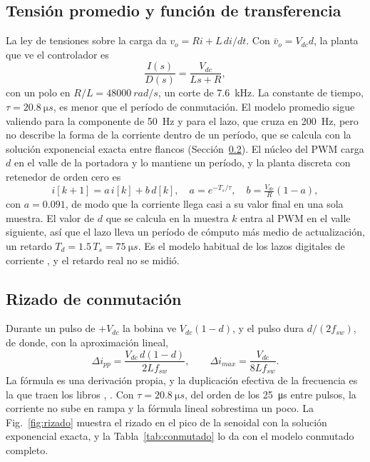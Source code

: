 \documentclass[journal]{IEEEtran}
\begin{document}
\subsection{Tensión promedio y función de transferencia}
\label{sec:ft}
La ley de tensiones sobre la carga da $v_o=Ri+L\,di/dt$. Con $\bar v_o=V_{dc}d$, la planta que ve el controlador es
\begin{equation}
	\frac{I(s)}{D(s)}=\frac{V_{dc}}{Ls+R},
	\label{eq:planta}
\end{equation}
con un polo en $R/L=\SI{48000}{rad/s}$, un corte de \SI{7.6}{kHz}. La constante de tiempo, $\tau=\SI{20.8}{\micro s}$, es menor que el período de conmutación. El modelo promedio sigue valiendo para la componente de \SI{50}{Hz} y para el lazo, que cruza en \SI{200}{Hz}, pero no describe la forma de la corriente dentro de un período, que se calcula con la solución exponencial exacta entre flancos (Sección~\ref{sec:rizado}). El núcleo del PWM carga $d$ en el valle de la portadora y lo mantiene un período, y la planta discreta con retenedor de orden cero es
\begin{equation}
	i[k+1]=a\,i[k]+b\,d[k],\quad a=e^{-T_s/\tau},\quad b=\tfrac{V_{dc}}{R}(1-a),
	\label{eq:discreta}
\end{equation}
con $a=\num{0.091}$, de modo que la corriente llega casi a su valor final en una sola muestra. El valor de $d$ que se calcula en la muestra $k$ entra al PWM en el valle siguiente, así que el lazo lleva un período de cómputo más medio de actualización, un retardo $T_d=1.5\,T_s=\SI{75}{\micro s}$. Es el modelo habitual de los lazos digitales de corriente \cite{buso2006}, y el retardo real no se midió.

\subsection{Rizado de conmutación}
\label{sec:rizado}
Durante un pulso de $+V_{dc}$ la bobina ve $V_{dc}(1-d)$, y el pulso dura $d/(2f_{sw})$, de donde, con la aproximación lineal,
\begin{equation}
	\Delta i_{pp}=\frac{V_{dc}\,d(1-d)}{2Lf_{sw}},\qquad
	\Delta i_{max}=\frac{V_{dc}}{8Lf_{sw}}.
	\label{eq:rizado}
\end{equation}
La fórmula es una derivación propia, y la duplicación efectiva de la frecuencia es la que traen los libros \cite[sec.~8-3-2]{mohan2003power}, \cite[sec.~8.11]{hart2011}. Con $\tau=\SI{20.8}{\micro s}$, del orden de los \SI{25}{\micro s} entre pulsos, la corriente no sube en rampa y la fórmula lineal sobrestima un poco. La Fig.~\ref{fig:rizado} muestra el rizado en el pico de la senoidal con la solución exponencial exacta, y la Tabla~\ref{tab:conmutado} lo da con el modelo conmutado completo.
\end{document}
